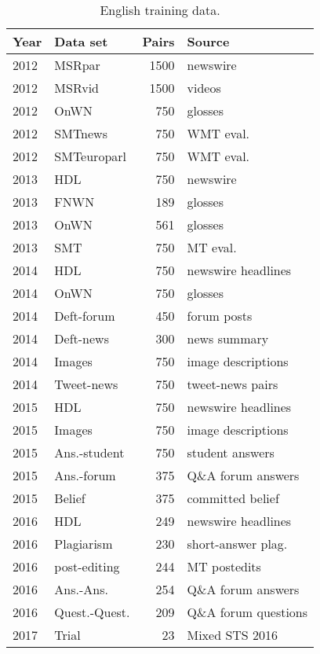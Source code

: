 \documentclass[11pt,a4paper]{article}
\begin{document}
\begin{table}[t]
\small
\begin{center}
\begin{tabular}{|l|l|r|l|} 
\hline
     Year & Data set         & Pairs &  Source\\
\hline
2012 & MSRpar    & 1500  &  newswire\\
2012 &MSRvid    &     1500 &videos\\
2012 &OnWN      &     750  &glosses\\
2012 &SMTnews   &     750  &WMT eval.\\
2012 &SMTeuroparl &   750  &WMT eval.\\
\hline
2013 &HDL &     750  &newswire\\
2013 &FNWN      & 189      & glosses\\
2013 &OnWN      & 561     & glosses\\
2013 &SMT       &750      & MT eval.\\
\hline
2014 &HDL &     750  &newswire headlines\\
2014 &OnWN      & 750     & glosses\\
2014 &Deft-forum       &450      &forum posts\\
2014 &Deft-news     &300    &news summary\\
2014 &Images       &750      & image descriptions\\
2014 &Tweet-news &750      & tweet-news pairs\\
\hline
2015 &HDL &     750  &newswire headlines\\
2015 &Images       &750      & image descriptions\\
2015 &Ans.-student &750      & student answers\\
2015 &Ans.-forum &375      & Q\&A forum answers\\
2015 &Belief &375      & committed belief\\
\hline
2016 & HDL & 249 & newswire headlines\\
2016 & Plagiarism & 230 & short-answer plag. \\
2016 & post-editing & 244 & MT postedits \\
2016 & Ans.-Ans. & 254 & Q\&A forum answers\\
2016 & Quest.-Quest. & 209 & Q\&A forum questions\\
\hline
2017 & Trial & 23 & Mixed STS 2016 \\
\hline
\end{tabular}
\end{center}
\caption{English training data.
}
\label{tab:en-summary}
\end{table}
\end{document}
